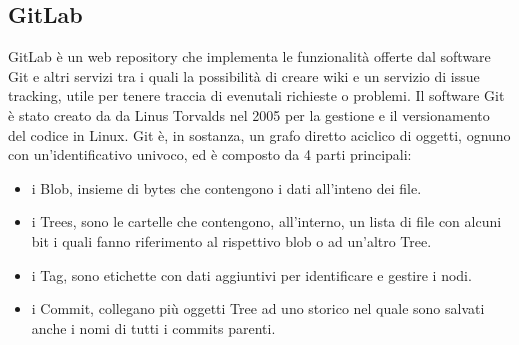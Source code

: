 \subsection{GitLab}
GitLab \`e un web repository che implementa le funzionalit\`a offerte dal software Git e altri
servizi tra i quali la possibilit\`a di creare wiki e un servizio di issue tracking, utile per tenere traccia
di evenutali richieste o problemi.
Il software Git \`e stato creato da da Linus Torvalds nel 2005 per la gestione e il versionamento del codice in Linux.
Git \`e, in sostanza, un grafo diretto aciclico di oggetti, ognuno con un'identificativo univoco, ed \`e composto da 4 parti principali:
\begin{itemize}
\item i Blob, insieme di bytes che contengono i dati all'inteno dei file.
\item i Trees, sono le cartelle che contengono, all'interno, un lista di file con alcuni bit i quali fanno riferimento al
rispettivo blob o ad un'altro Tree.
\item i Tag, sono etichette con dati aggiuntivi per identificare e gestire i nodi.
\item i Commit, collegano pi\`u oggetti Tree ad uno storico nel quale sono salvati anche i nomi di tutti i commits parenti.
\end{itemize}
